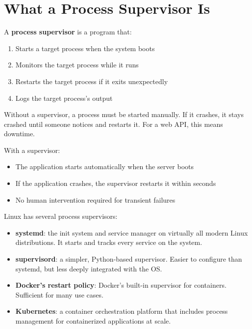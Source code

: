 \setcounter{section}{0}
\section{What a Process Supervisor Is}\label{25-process-management:251-what-a-process-supervisor-is}

A \textbf{process supervisor} is a program that:

\begin{enumerate}
\def\labelenumi{\arabic{enumi}.}
\tightlist
\item
  Starts a target process when the system boots
\item
  Monitors the target process while it runs
\item
  Restarts the target process if it exits unexpectedly
\item
  Logs the target process's output
\end{enumerate}

\noindent{}Without a supervisor, a process must be started manually. If it crashes, it stays crashed until someone notices and restarts it. For a web API, this means downtime.

With a supervisor:

\begin{itemize}
\tightlist
\item
  The application starts automatically when the server boots
\item
  If the application crashes, the supervisor restarts it within seconds
\item
  No human intervention required for transient failures
\end{itemize}

\noindent{}Linux has several process supervisors:

\begin{itemize}
\tightlist
\item
  \textbf{systemd}: the init system and service manager on virtually all modern Linux distributions. It starts and tracks every service on the system.
\item
  \textbf{supervisord}: a simpler, Python-based supervisor. Easier to configure than systemd, but less deeply integrated with the OS.
\item
  \textbf{Docker's restart policy}: Docker's built-in supervisor for containers. Sufficient for many use cases.
\item
  \textbf{Kubernetes}: a container orchestration platform that includes process management for containerized applications at scale.
\end{itemize}


